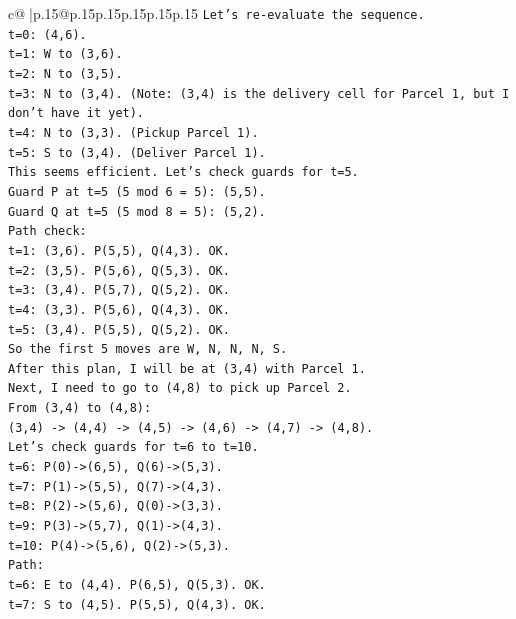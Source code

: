 \documentclass{article}
\begin{document}
{\begin{supertabular}{c@{$\;$}|p{.15\linewidth}@{}p{.15\linewidth}p{.15\linewidth}p{.15\linewidth}p{.15\linewidth}p{.15\linewidth}}
{{{\texttt{Let's re{-}evaluate the sequence.} \\
\texttt{t=0: (4,6).} \\
\texttt{t=1: W to (3,6).} \\
\texttt{t=2: N to (3,5).} \\
\texttt{t=3: N to (3,4). (Note: (3,4) is the delivery cell for Parcel 1, but I don't have it yet).} \\
\texttt{t=4: N to (3,3). (Pickup Parcel 1).} \\
\texttt{t=5: S to (3,4). (Deliver Parcel 1).} \\
\texttt{This seems efficient. Let's check guards for t=5.} \\
\texttt{Guard P at t=5 (5 mod 6 = 5): (5,5).} \\
\texttt{Guard Q at t=5 (5 mod 8 = 5): (5,2).} \\
\texttt{Path check:} \\
\texttt{t=1: (3,6). P(5,5), Q(4,3). OK.} \\
\texttt{t=2: (3,5). P(5,6), Q(5,3). OK.} \\
\texttt{t=3: (3,4). P(5,7), Q(5,2). OK.} \\
\texttt{t=4: (3,3). P(5,6), Q(4,3). OK.} \\
\texttt{t=5: (3,4). P(5,5), Q(5,2). OK.} \\
\texttt{So the first 5 moves are W, N, N, N, S.} \\
\texttt{After this plan, I will be at (3,4) with Parcel 1.} \\
\texttt{Next, I need to go to (4,8) to pick up Parcel 2.} \\
\texttt{From (3,4) to (4,8):} \\
\texttt{(3,4) {-}> (4,4) {-}> (4,5) {-}> (4,6) {-}> (4,7) {-}> (4,8).} \\
\texttt{Let's check guards for t=6 to t=10.} \\
\texttt{t=6: P(0){-}>(6,5), Q(6){-}>(5,3).} \\
\texttt{t=7: P(1){-}>(5,5), Q(7){-}>(4,3).} \\
\texttt{t=8: P(2){-}>(5,6), Q(0){-}>(3,3).} \\
\texttt{t=9: P(3){-}>(5,7), Q(1){-}>(4,3).} \\
\texttt{t=10: P(4){-}>(5,6), Q(2){-}>(5,3).} \\
\texttt{Path:} \\
\texttt{t=6: E to (4,4). P(6,5), Q(5,3). OK.} \\
\texttt{t=7: S to (4,5). P(5,5), Q(4,3). OK.} \\
}}}
\end{supertabular}}
\end{document}
